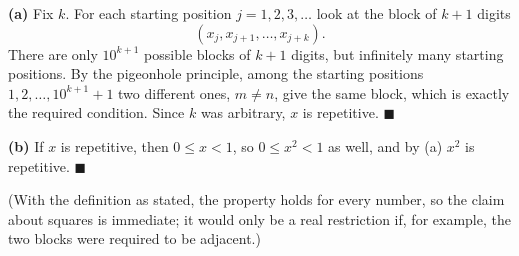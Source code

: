 \textbf{(a)} Fix $k$. For each starting position $j=1,2,3,\dots$ look at the block of $k+1$ digits
\[\left(x_j,x_{j+1},\dots,x_{j+k}\right).\]
There are only $10^{k+1}$ possible blocks of $k+1$ digits, but infinitely many starting positions. By the pigeonhole principle, among the starting positions $1,2,\dots,10^{k+1}+1$ two different ones, $m\ne n$, give the same block, which is exactly the required condition. Since $k$ was arbitrary, $x$ is repetitive. $\blacksquare$

\textbf{(b)} If $x$ is repetitive, then $0\le x<1$, so $0\le x^2<1$ as well, and by (a) $x^2$ is repetitive. $\blacksquare$

(With the definition as stated, the property holds for every number, so the claim about squares is immediate; it would only be a real restriction if, for example, the two blocks were required to be adjacent.)
